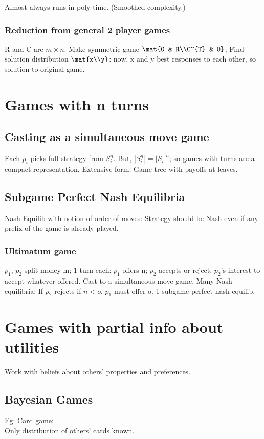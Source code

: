 \documentclass[oneside, article]{memoir}
\begin{document}
Almost always runs in poly time. (Smoothed complexity.)

\subsubsection{Reduction from general 2 player games}
R and C are $m\times n$. Make symmetric game $\mat{0 & R\\C^{T} & 0}$; Find solution distribution $\mat{x\\y}$: now, x and y best responses to each other, so solution to original game.

\section{Games with n turns}
\subsection{Casting as a simultaneous move game}
Each $p_{i}$ picks full strategy from $S_{i}^{n}$. But, $|S_{i}^{n}| = |S_{i}|^{n}$; so games with turns are a compact representation. Extensive form: Game tree with payoffs at leaves.

\subsection{Subgame Perfect Nash Equilibria}
Nash Equilib with notion of order of moves: Strategy should be Nash even if any prefix of the game is already played.

\subsubsection{Ultimatum game}
$p_{1}$, $p_{2}$ split money m; 1 turn each: $p_{1}$ offers n; $p_{2}$ accepts or reject. $p_{2}$'s interest to accept whatever offered. Cast to a simultaneous move game. Many Nash equilibria: If $p_{2}$ rejects if $n < o$, $p_{1}$ must offer o. 1 subgame perfect nash equilib.

\section{Games with partial info about utilities}
Work with beliefs about others' properties and preferences. 

\subsection{Bayesian Games}
Eg: Card game: \\
Only distribution of others' cards known.
\end{document}

